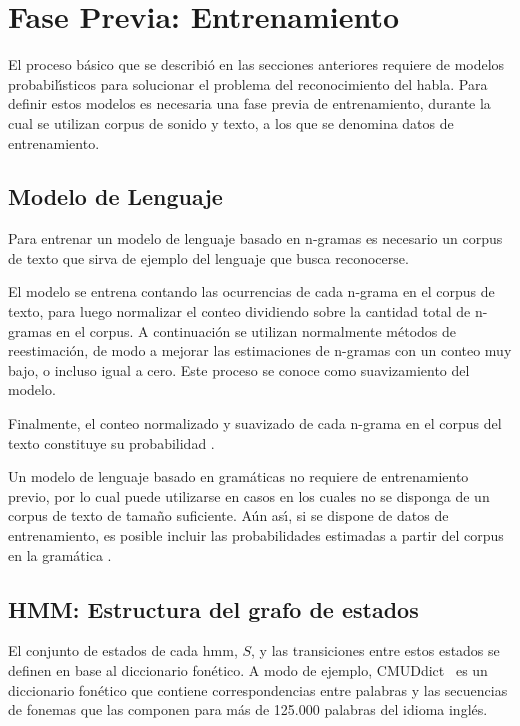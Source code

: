 \section{Fase Previa: Entrenamiento}
\label{sec:training}

El proceso b\'asico que se describi\'o en las secciones anteriores requiere de modelos 
probabil{\'\i}sticos para solucionar el problema del reconocimiento del habla. Para definir estos 
modelos es necesaria una fase previa de entrenamiento, durante la cual se utilizan corpus de sonido 
y texto, a los que se denomina datos de entrenamiento.

\subsection{Modelo de Lenguaje}

Para entrenar un modelo de lenguaje basado en n-gramas es necesario un corpus de texto que 
sirva de ejemplo del lenguaje que busca reconocerse.

El modelo se entrena contando las ocurrencias de cada n-grama en el corpus de texto, para luego
normalizar el conteo dividiendo sobre la cantidad total de n-gramas en el corpus.
A continuaci\'on se utilizan normalmente m\'etodos de reestimaci\'on, de modo a mejorar las estimaciones 
de n-gramas con un conteo muy bajo, o incluso igual a cero. Este proceso se conoce como suavizamiento
del modelo.

Finalmente, el conteo normalizado y suavizado de cada n-grama en el corpus del texto constituye su
probabilidad \cite{CollinsLanguage}.

Un modelo de lenguaje basado en gram\'aticas no requiere de entrenamiento previo, por lo cual puede
utilizarse en casos en los cuales no se disponga de un corpus de texto de tama\~no suficiente.
A\'un as{\'\i}, si se dispone de datos de entrenamiento, es posible incluir las probabilidades estimadas
a partir del corpus en la gram\'atica \cite{huang-handbook10}.

\subsection{HMM: Estructura del grafo de estados}
El conjunto de estados de cada \gls{hmm}, $S$, y las transiciones entre estos estados se definen en base
al diccionario fon\'etico. A modo de ejemplo, \mbox{CMUDdict \cite{CMUdict}} es un diccionario fon\'etico
que contiene correspondencias entre palabras y las secuencias de fonemas que las componen para m\'as de
125.000 palabras del idioma ingl\'es.


